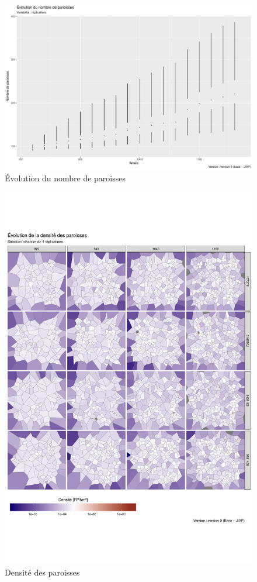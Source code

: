 
\begin{figure}[H]
\captionsetup{width=\linewidth}
\includegraphics[width=0.75\linewidth]{img/resultats/v0_nombre_paroisses.pdf}
\caption{Évolution du nombre de paroisses} 
\label{fig:nb-paroisses-v0} 
\end{figure}

\begin{figure}[H]
\captionsetup{width=\linewidth}
\includegraphics[width=0.8\linewidth]{img/resultats/v0_paroisses_densite.pdf}
\caption{Densité des paroisses} 
\label{fig:densite-paroisses-v0} 
\end{figure}


